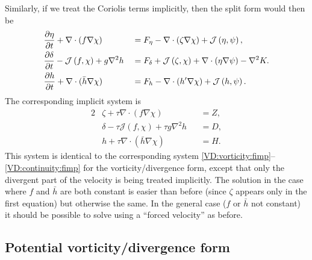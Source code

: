 \documentclass[12pt]{article}
\newcommand{\href}{\bar{h}}
\newcommand{\del}{\nabla}
\newcommand{\jacobian}[2]{\mathcal{J}\left(#1,#2\right)}
\begin{document}
Similarly, if we treat the Coriolis terms implicitly, then the split form
would then be
\begin{alignat}{2}
   &\frac{\partial \eta}{\partial t} + \del\cdot(f\del\chi) &&=
      \Feta - \del\cdot(\zeta\del\chi) 
      + \jacobian{\eta}{\psi},
\label{SFVP:vorticity:fsplit}
\\
   &\frac{\partial \delta}{\partial t} - \jacobian{f}{\chi} + g\del^2 h &&= 
      \Fdelta + \jacobian{\zeta}{\chi} + \del\cdot(\eta\del\psi) 
      - \del^2 K.
\label{SFVP:divergence:fsplit}
\\
  &\frac{\partial h}{\partial t} + \del\cdot(\href\del\chi)
    &&= \Fmass - \del\cdot(h'\del\chi) + \jacobian{h}{\psi} .
\label{SFVP:continuity:fsplit}
\end{alignat}
The corresponding implicit system is
\begin{alignat}{2}
   &\zeta + \tau\del\cdot(f\del\chi) &&= Z,
\label{SFVP:vorticity:fimp}
\\
   &\delta  - \tau\jacobian{f}{\chi} + \tau g\del^2 h &&= D,
\label{SFVP:divergence:fimp}
\\
  &h + \tau \del\cdot(\href\del\chi) &&= H .
\label{SFVP:continuity:fimp}
\end{alignat}
This system is identical to the corresponding system
\eqref{VD:vorticity:fimp}--\eqref{VD:continuity:fimp}
for the vorticity/divergence form, except that only the divergent part of the 
velocity is being treated implicitly.  The solution in the case where $f$ and
$\href$ are both constant is easier than before (since $\zeta$ appears only in
the first equation) but otherwise the same.  In the general case ($f$ or
$\href$ not constant) it should be possible to solve using a ``forced
velocity'' as before.

\pagebreak[3]
\subsection{Potential vorticity/divergence form}

\newcommand{\PV}{q}
\newcommand{\FPV}{F_q}
\end{document}
